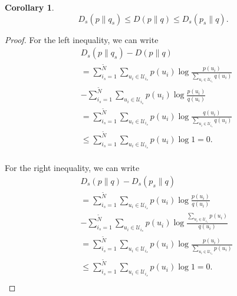 \documentclass[12pt, draftclsnofoot,onecolumn]{IEEEtran}
\newtheorem{corollary}{\bf{Corollary}}
\begin{document}
\begin{corollary}
\begin{equation}
D_s(p\|q_s)\leq D(p\|q) \leq D_s(p_s\|q).
\end{equation}
\end{corollary}
\begin{proof}
For the left inequality, we can write
\begin{equation}
\begin{aligned}
&D_s(p\|q_s)-D(p\|q) \\
&=\sum_{i_s=1}^{\tilde{N}}\sum_{u_i\in \mathcal{U}_{i_s}}p(u_i) \log \frac {p(u_i)}{\sum_{u_i\in \mathcal{U}_{i_s}} q(u_i)}\\
&-\sum_{i_s=1}^{\tilde{N}}\sum_{u_i\in \mathcal{U}_{i_s}}p(u_i) \log \frac{p(u_i)}{q(u_i)}\\
&=\sum_{i_s=1}^{\tilde{N}}\sum_{u_i\in \mathcal{U}_{i_s}}p(u_i) \log \frac{q(u_i)}{\sum_{u_i\in \mathcal{U}_{i_s}} q(u_i)}\\
&\leq \sum_{i_s=1}^{\tilde{N}}\sum_{u_i\in \mathcal{U}_{i_s}}p(u_i) \log 1=0.\\
\end{aligned}
\end{equation}

For the right inequality, we can write
\begin{equation}
\begin{aligned}
&D_s(p\|q)-D_s(p_s\|q)\\
&=\sum_{i_s=1}^{\tilde{N}}\sum_{u_i\in \mathcal{U}_{i_s}}p(u_i) \log \frac{p(u_i)}{q(u_i)}\\
&-\sum_{i_s=1}^{\tilde{N}}\sum_{u_i\in \mathcal{U}_{i_s}}p(u_i) \log \frac{\sum_{u_i\in \mathcal{U}_{i_s}} p(u_i)}{q(u_i)}\\
&=\sum_{i_s=1}^{\tilde{N}}\sum_{u_i\in \mathcal{U}_{i_s}}p(u_i) \log \frac{p(u_i)}{\sum_{u_i\in \mathcal{U}_{i_s}} p(u_i)}\\
&\leq \sum_{i_s=1}^{\tilde{N}}\sum_{u_i\in \mathcal{U}_{i_s}}p(u_i) \log 1=0.\\
\end{aligned}
\end{equation}
\end{proof}
\end{document}
